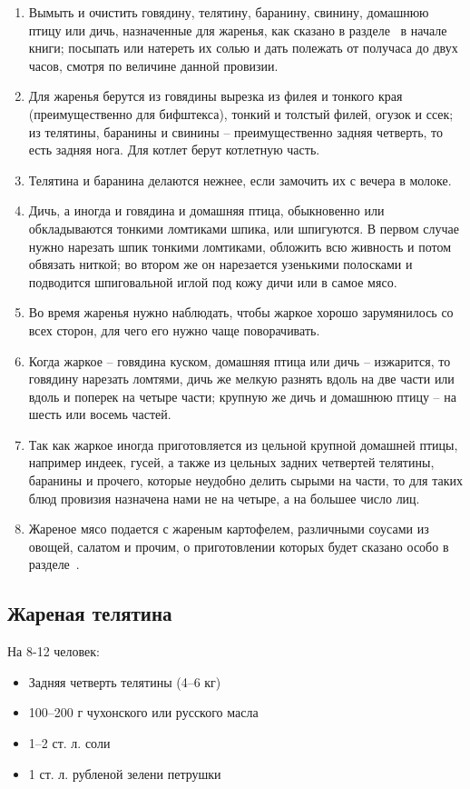 \begin{enumerate}
	\item Вымыть и очистить говядину, телятину, баранину, свинину, домашнюю птицу или дичь, назначенные для жаренья, как сказано в разделе~ в начале книги; посыпать или натереть их солью и дать полежать от получаса до двух часов, смотря по величине данной провизии.
	\item Для жаренья берутся из говядины вырезка из филея и тонкого края (преимущественно для бифштекса), тонкий и толстый филей, огузок и ссек; из телятины, баранины и свинины – преимущественно задняя четверть, то есть задняя нога. Для котлет берут котлетную часть.
	\item Телятина и баранина делаются нежнее, если замочить их с вечера в молоке.
	\item Дичь, а иногда и говядина и домашняя птица, обыкновенно или обкладываются тонкими ломтиками шпика, или шпигуются. В первом случае нужно нарезать шпик тонкими ломтиками, обложить всю живность и потом обвязать ниткой; во втором же он нарезается узенькими полосками и подводится шпиговальной иглой под кожу дичи или в самое мясо.
	\item Во время жаренья нужно наблюдать, чтобы жаркое хорошо зарумянилось со всех сторон, для чего его нужно чаще поворачивать.
	\item Когда жаркое – говядина куском, домашняя птица или дичь – изжарится, то говядину нарезать ломтями, дичь же мелкую разнять вдоль на две части или вдоль и поперек на четыре части; крупную же дичь и домашнюю птицу – на шесть или восемь частей.
	\item Так как жаркое иногда приготовляется из цельной крупной домашней птицы, например индеек, гусей, а также из цельных задних четвертей телятины, баранины и прочего, которые неудобно делить сырыми на части, то для таких блюд провизия назначена нами не на четыре, а на большее число лиц.
	\item Жареное мясо подается с жареным картофелем, различными соусами из овощей, салатом и прочим, о приготовлении которых будет сказано особо в разделе~.
\end{enumerate}

\subsection{Жареная телятина}\label{1zhar-teliat}

На 8-12 человек: 

\begin{itemize} 	
	\item Задняя четверть телятины (4–6 кг) 
	\item 100–200 г чухонского или русского масла 
    \item 1–2 ст. л. соли 
    \item 1 ст. л. рубленой зелени петрушки
\end{itemize}

